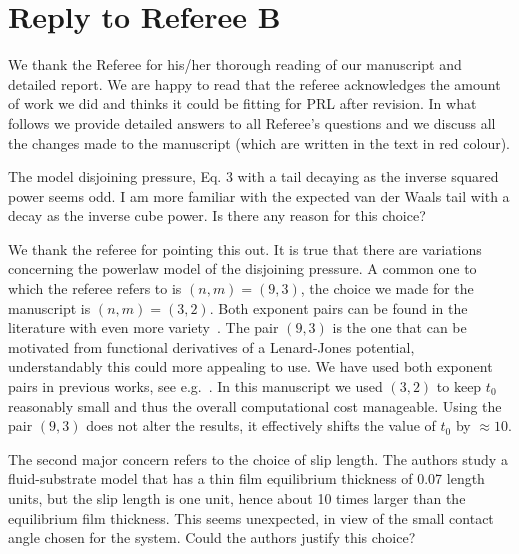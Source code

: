 \documentclass[12pt,english]{article}
\begin{document}
\section*{Reply to Referee B}

We thank the Referee for his/her thorough reading of our manuscript and detailed report.
We are happy to read that the referee acknowledges the amount of work we did and thinks it could be fitting for PRL after revision.
In what follows we provide detailed answers to all Referee's questions and we discuss all the changes made to the manuscript
(which are written in the text in red colour).

\begin{itemize}


\item[ \textbf{\underline{Comment 1.}}]
{
The model disjoining pressure, Eq. 3 with a tail decaying as the inverse squared power seems odd. 
I am more familiar with the expected van der Waals tail with a decay as the inverse cube power. 
Is there any reason for this choice?

\item[ \textbf{Answer}]
{
We thank the referee for pointing this out.
It is true that there are variations concerning the powerlaw model of the disjoining pressure.
A common one to which the referee refers to is $(n,m) = (9,3)$, the choice we made for the manuscript is $(n,m) = (3,2)$.
Both exponent pairs can be found in the literature with even more variety~\cite{moulton_lega_2013,SCHWARTZ1998173,doi:10.1063/1.4828721,brasjen2013dewetting}.
The pair $(9,3)$ is the one that can be motivated from functional derivatives of a Lenard-Jones potential, understandably this could more appealing to use.
We have used both exponent pairs in previous works, see e.g.~\cite{PhysRevE.104.034801}.
In this manuscript we used $(3,2)$ to keep $t_0$ reasonably small and thus the overall computational cost manageable.
Using the pair $(9,3)$ does not alter the results, it effectively shifts the value of $t_0$ by $\approx 10$.
}

\item[ \textbf{\underline{Comment 3.}}]
The second major concern refers to the choice of slip length. 
The authors study a fluid-substrate model that has a thin film equilibrium thickness of 0.07 length units, but the slip length is one unit, hence about 10 times larger than the equilibrium film thickness. 
This seems unexpected, in view of the small contact angle chosen for the system. 
Could the authors justify this choice?
}


\end{itemize}
\end{document}

